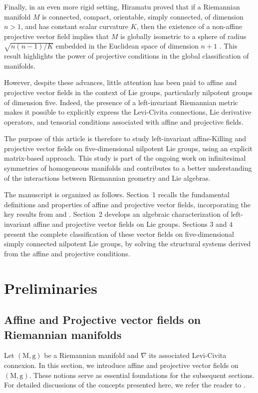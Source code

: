 \documentclass[10pt]{article}
\begin{document}
Finally, in an even more rigid setting, Hiramatu proved that if a Riemannian manifold $M$ is connected, compact, orientable, simply connected, of dimension $n > 1$, and has constant scalar curvature $K$, then the existence of a non-affine projective vector field implies that $M$ is globally isometric to a sphere of radius $\sqrt{n(n-1)/K}$ embedded in the Euclidean space of dimension $n+1$ \cite{hiramatu1980}. This result highlights the power of projective conditions in the global classification of manifolds.

However, despite these advances, little attention has been paid to affine and projective vector fields in the context of Lie groups, particularly nilpotent groups of dimension five. Indeed, the presence of a left-invariant Riemannian metric makes it possible to explicitly express the Levi-Civita connections, Lie derivative operators, and tensorial conditions associated with affine and projective fields.

The purpose of this article is therefore to study left-invariant affine-Killing and projective vector fields on five-dimensional nilpotent Lie groups, using an explicit matrix-based approach. This study is part of the ongoing work on infinitesimal symmetries of homogeneous manifolds and contributes to a better understanding of the interactions between Riemannian geometry and Lie algebras.

The manuscript is organized as follows. Section~1 recalls the fundamental definitions and properties of affine and projective vector fields, incorporating the key results from \cite{w} and \cite{Fok}. Section~2 develops an algebraic characterization of left-invariant affine and projective vector fields on Lie groups. Sections $3$ and $4$ present the complete classification of these vector fields on five-dimensional simply connected nilpotent Lie groups, by solving the structural systems derived from the affine and projective conditions.





\section{Preliminaries}
\subsection{Affine and Projective vector fields on Riemannian manifolds}
Let $(\mathrm{M},\mathrm{g})$ be a Riemannian manifold and $\nabla$ its associated Levi-Civita connexion.
In this section, we introduce affine and projective vector fields on $(\mathrm{M},\mathrm{g})$. These notions serve as essential foundations for the subsequent sections. For detailed discussions of the concepts presented here, we refer the reader to \cite{w}.
\end{document}
